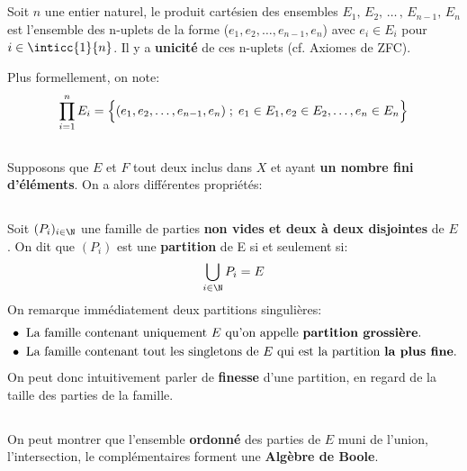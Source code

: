 \subsection*{}
Soit \(n\) une entier naturel, le produit cartésien des ensembles \(E_1,\, E_2,\, \ldots\,,\, E_{n-1},\, E_n\) est l'ensemble des n-uplets de la forme (\(e_1, e_2, \ldots, e_{n-1}, e_n\)) avec \(e_i \in E_i\) pour \(i \in \inticc{1}{n}\).
Il y a \textbf{unicité} de ces n-uplets (cf. Axiomes de ZFC).

Plus formellement, on note:
\[
     \prod_{i=1}^{n} E_i = \Bigl\{ (e_1, e_2, \ldots, e_{n-1}, e_n) \; ; \; e_1 \in E_1, e_2 \in E_2, \ldots,  e_n \in E_n \Bigl\}
\]
\pagebreak
\subsection*{}
Supposons que \(E\) et \(F\) tout deux inclus dans \(X\) et ayant \textbf{un nombre fini d'éléments}. On a alors différentes propriétés:

\subsection*{}
Soit \((P_i)_{i \in \N}\) une famille de parties \textbf{non vides et deux à deux disjointes} de \(E\).\+
On dit que \((P_i)\) est une \textbf{partition} de E si et seulement si:
\[
    \bigcup_{i \in \N} P_i = E
\]
On remarque immédiatement deux partitions singulières:
\begin{align*}
    &\bullet \text{ La famille contenant uniquement } E \text{ qu'on appelle \textbf{partition grossière}.} \\
    &\bullet \text{ La famille contenant tout les singletons de } E \text{ qui est la partition \textbf{la plus fine}.}
\end{align*}
On peut donc intuitivement parler de \textbf{finesse} d'une partition, en regard de la taille des parties de la famille.

\subsection*{}
On peut montrer que l'ensemble \textbf{ordonné} des parties de \(E\) muni de l'union, l'intersection, le complémentaires forment une \textbf{Algèbre de Boole}.\<

